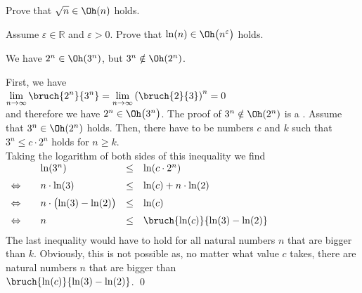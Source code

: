 \exercise
Prove that $\sqrt{n} \in \Oh(n)$ holds.  \eox

\exercise
Assume $\varepsilon \in \mathbb{R}$ and $\varepsilon > 0$.  Prove that $\ln(n) \in
\Oh\bigl(n^{\varepsilon}\bigr)$ holds. \eox

\example
We have $2^n \in \Oh(3^n)$, but  $3^n \notin \Oh(2^n)$.
\ex

\proof
 First, we have \\[0.2cm]
\hspace*{1.3cm} 
$\displaystyle\lim\limits_{n \rightarrow \infty} \bruch{2^n}{3^n} = 
 \lim\limits_{n \rightarrow \infty} \left(\bruch{2}{3}\right)^n = 0$
\\[0.2cm]
and therefore we have $2^n \in \Oh\bigl(3^n\bigr)$.  The proof of $3^n \notin \Oh(2^n)$ is a 
.  Assume that 
$3^n \in \Oh(2^n)$ holds.  Then, there have to be numbers $c$ and $k$ such that 
\\[0.2cm]
\hspace*{1.3cm}
$3^n \leq c \cdot 2^n$ \quad holds for $n \geq k$. 
\\[0.2cm]
Taking the logarithm of both sides of this inequality we find 
\\[0.2cm]
\hspace*{1.3cm}
$
\begin{array}{llcl}
                & \ln(3^n) & \leq & \ln(c \cdot 2^n) \\[0.2cm]
\Leftrightarrow\quad &  n \cdot \ln(3) & \leq & \ln(c) + n \cdot \ln(2) \\[0.2cm]
\Leftrightarrow &  n \cdot \bigl(\ln(3) - \ln(2)\bigr) & \leq & \ln(c)  \\[0.2cm]
\Leftrightarrow &  n  & \leq & \bruch{\ln(c)}{\ln(3) - \ln(2)}          \\[0.2cm]
\end{array}
$
\\[0.2cm]
The last inequality would have to hold for all natural numbers $n$ that are bigger than $k$.  Obviously,
this is not possible as, no matter what value $c$ takes, there are natural numbers $n$ that are bigger than 
\\[0.2cm]
\hspace*{1.3cm}
$\bruch{\ln(c)}{\ln(3) - \ln(2)}$.
\qed

